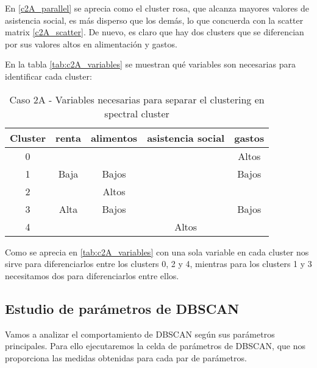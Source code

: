 En \eqref{c2A_parallel} se aprecia como el cluster rosa, que alcanza mayores valores de asistencia social, es más disperso que los demás, lo que concuerda con la scatter matrix \eqref{c2A_scatter}. De nuevo, es claro que hay dos clusters que se diferencian por sus valores altos en alimentación y gastos.

En la tabla  \eqref{tab:c2A_variables} se muestran qué variables son necesarias para identificar cada cluster:

\begin{table}[H]
\centering
\caption{Caso 2A - Variables necesarias para separar el clustering en spectral cluster}
\label{tab:c2A_variables}
\begin{tabular}{ccccc}
\toprule
 Cluster & renta & alimentos & asistencia social & gastos \\
\midrule
0 & & & & Altos \\
1 & Baja & Bajos & & Bajos \\
2 & & Altos & & \\
3 & Alta & Bajos & & Bajos \\
4 & & & Altos & \\
\bottomrule
\end{tabular}
\end{table}
Como se aprecia en \eqref{tab:c2A_variables} con una sola variable en cada cluster nos sirve para diferenciarlos entre los clusters 0, 2 y 4, mientras para los clusters 1 y 3 necesitamos dos para diferenciarlos entre ellos.

\subsection{Estudio de parámetros de DBSCAN}

Vamos a analizar el comportamiento de DBSCAN según sus parámetros principales. Para ello ejecutaremos la celda de parámetros de DBSCAN, que nos proporciona las medidas obtenidas para cada par de parámetros.

